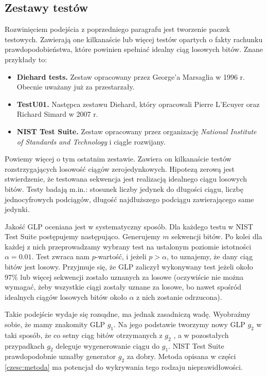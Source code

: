 \documentclass[a4paper,11pt,twoside]{book}
\theoremstyle{definition}
\begin{document}
\subsection*{Zestawy testów}
Rozwinięciem podejścia z poprzedniego paragrafu jest tworzenie paczek testowych. Zawierają one kilkanaście lub więcej testów opartych o fakty rachunku prawdopodobieństwa, które powinien spełniać idealny ciąg losowych bitów. Znane przykłady to:
\begin{itemize}
 \item \textbf{Diehard tests.} Zestaw opracowany przez George'a Marsaglia w 1996 r. Obecnie uważany już za przestarzały.
 \item \textbf{TestU01.} Następca zestawu Diehard, który opracowali Pierre L’Ecuyer oraz Richard Simard w 2007 r.
 \item \textbf{NIST Test Suite.} Zestaw opracowany przez organizację \textit{National Institute of Standards and Technology} i ciągle rozwijany. 
\end{itemize}

Powiemy więcej o tym ostatnim zestawie. Zawiera on kilkanaście testów rozstrzygających losowość ciągów zerojedynkowych. Hipotezą zerową jest stwierdzenie, że testowana sekwencja jest realizacją idealnego ciągu losowych bitów. Testy badają m.in.: stosunek liczby jedynek do długości ciągu, liczbę jednocyfrowych podciągów, długość najdłuższego podciągu zawierającego same jedynki.
 
Jakość GLP oceniana jest w systematyczny sposób. Dla każdego testu w NIST Test Suite postępujemy następująco. Generujemy $m$ sekwencji bitów. Po kolei dla każdej z nich przeprowadzamy wybrany test na ustalonym poziomie istotności $\alpha = 0.01$. Test zwraca nam $p$-wartość, i jeżeli $p > \alpha$, to uznajemy, że dany ciąg bitów jest losowy. Przyjmuje się, że GLP zaliczył wykonywany test jeżeli około 97\% lub więcej sekwencji zostało uznanych za losowe (oczywiście nie można wymagać, żeby wszystkie ciągi zostały uznane za losowe, bo nawet spośród idealnych ciągów losowych bitów około $\alpha$ z nich zostanie odrzucona).

Takie podejście wydaje się rozsądne, ma jednak zasadniczą wadę. Wyobraźmy sobie, że mamy znakomity GLP $g_1$. Na jego podstawie tworzymy nowy GLP $g_2$ w taki sposób, że co setny ciąg bitów otrzymanych z $g_2$ , a w pozostałych przypadkach $g_2$ deleguje wygenerowanie ciągu do $g_1$. NIST Test Suite prawdopodobnie uznałby generator $g_2$ za dobry. Metoda opisana w części \ref{czesc:metoda} ma potencjał do wykrywania tego rodzaju nieprawidłowości.
\end{document}
